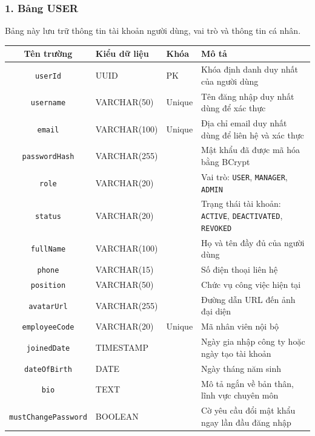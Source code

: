 \documentclass[12pt,a4paper]{report}
\begin{document}
\subsubsection{1. Bảng USER}
Bảng này lưu trữ thông tin tài khoản người dùng, vai trò và thông tin cá nhân.

\begin{table}[H]
\centering
\begin{tabularx}{\textwidth}{|c|l|l|X|}
\hline
\rowcolor{gray!10}
Tên trường & Kiểu dữ liệu & Khóa & Mô tả \\ \hline
\texttt{userId} & UUID & PK & Khóa định danh duy nhất của người dùng \\ \hline
\texttt{username} & VARCHAR(50) & Unique & Tên đăng nhập duy nhất dùng để xác thực \\ \hline
\texttt{email} & VARCHAR(100) & Unique & Địa chỉ email duy nhất dùng để liên hệ và xác thực \\ \hline
\texttt{passwordHash} & VARCHAR(255) &  & Mật khẩu đã được mã hóa bằng BCrypt \\ \hline
\texttt{role} & VARCHAR(20) &  & Vai trò: \texttt{USER}, \texttt{MANAGER}, \texttt{ADMIN} \\ \hline
\texttt{status} & VARCHAR(20) &  & Trạng thái tài khoản: \texttt{ACTIVE}, \texttt{DEACTIVATED}, \texttt{REVOKED} \\ \hline
\texttt{fullName} & VARCHAR(100) &  & Họ và tên đầy đủ của người dùng \\ \hline
\texttt{phone} & VARCHAR(15) &  & Số điện thoại liên hệ \\ \hline
\texttt{position} & VARCHAR(50) &  & Chức vụ công việc hiện tại \\ \hline
\texttt{avatarUrl} & VARCHAR(255) &  & Đường dẫn URL đến ảnh đại diện \\ \hline
\texttt{employeeCode} & VARCHAR(20) & Unique & Mã nhân viên nội bộ \\ \hline
\texttt{joinedDate} & TIMESTAMP &  & Ngày gia nhập công ty hoặc ngày tạo tài khoản \\ \hline
\texttt{dateOfBirth} & DATE &  & Ngày tháng năm sinh \\ \hline
\texttt{bio} & TEXT &  & Mô tả ngắn về bản thân, lĩnh vực chuyên môn \\ \hline
\texttt{mustChangePassword} & BOOLEAN &  & Cờ yêu cầu đổi mật khẩu ngay lần đầu đăng nhập \\ \hline
\end{tabularx}
\end{table}
\end{document}
